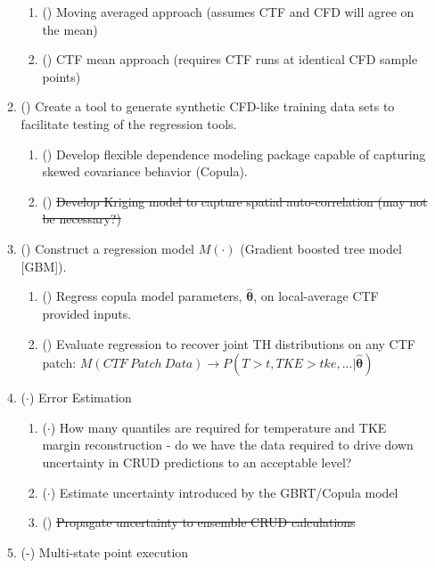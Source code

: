 \begin{enumerate}
\begin{enumerate}
        \begin{enumerate}
            \item (\checkmark) Moving averaged approach (assumes CTF and CFD will agree on the mean)
            \item (\checkmark) CTF mean approach (requires CTF runs at identical CFD sample points)
        \end{enumerate}
        \item (\checkmark) Create a tool to generate synthetic CFD-like training data sets to facilitate
            testing of the regression tools.
        \begin{enumerate}
            \item (\checkmark) Develop flexible dependence modeling package capable of capturing skewed covariance behavior (Copula).
            \item (\xmark) \sout{Develop Kriging model to capture spatial auto-correlation (may not be necessary?)}
        \end{enumerate}
        \item (\checkmark) Construct a regression model $M(\cdot)$ (Gradient boosted tree model [GBM]).
        \begin{enumerate}
            \item (\checkmark) Regress copula model parameters, $\bm{\hat\theta}$, on local-average CTF provided inputs.
            \item (\checkmark) Evaluate regression to recover joint TH distributions on any CTF patch:
                $M(CTF\ Patch\ Data) \rightarrow {P(T>t,TKE>tke,...|\bm{\hat\theta})}$
        \end{enumerate}
        \item ($\cdot$) Error Estimation
        \begin{enumerate}
        	\item ($\cdot$) How many quantiles are required for temperature and TKE margin reconstruction
                                - do we have the data required to drive down uncertainty in CRUD predictions to an acceptable level?
            \item ($\cdot$) Estimate uncertainty introduced by the GBRT/Copula model
            \item (\xmark) \sout{Propagate uncertainty to ensemble CRUD calculations}
        \end{enumerate}
        \item (\checkmark-) Multi-state point execution

\end{enumerate}
\end{enumerate}
